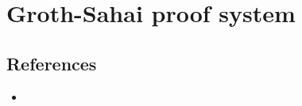 \section{Groth-Sahai proof system}

\subsection{References}
    \begin{itemize}
        \item 
    \end{itemize}
